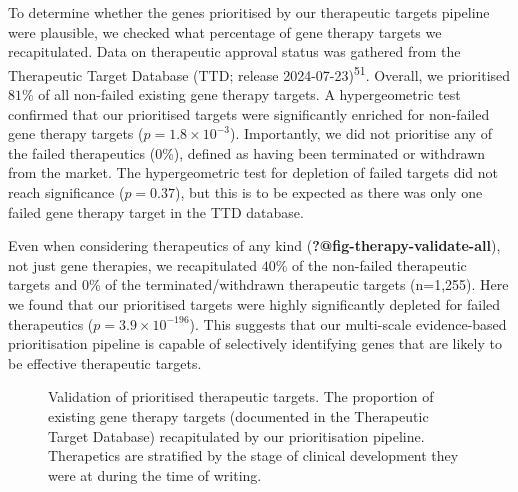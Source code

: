 \documentclass[
]{report}
\begin{document}
To determine whether the genes prioritised by our therapeutic targets
pipeline were plausible, we checked what percentage of gene therapy
targets we recapitulated. Data on therapeutic approval status was
gathered from the Therapeutic Target Database (TTD; release
2024-07-23)\textsuperscript{51}. Overall, we prioritised \(81\)\% of all
non-failed existing gene therapy targets. A hypergeometric test
confirmed that our prioritised targets were significantly enriched for
non-failed gene therapy targets (\(p=\)\(1.8 \times 10^{-3}\)).
Importantly, we did not prioritise any of the failed therapeutics (0\%),
defined as having been terminated or withdrawn from the market. The
hypergeometric test for depletion of failed targets did not reach
significance (\(p=\)\(0.37\)), but this is to be expected as there was
only one failed gene therapy target in the TTD database.

Even when considering therapeutics of any kind
(\textbf{?@fig-therapy-validate-all}), not just gene therapies, we
recapitulated \(40\)\% of the non-failed therapeutic targets and 0\% of
the terminated/withdrawn therapeutic targets (n=1,255). Here we found
that our prioritised targets were highly significantly depleted for
failed therapeutics (\(p=\)\(3.9 \times 10^{-196}\)). This suggests that
our multi-scale evidence-based prioritisation pipeline is capable of
selectively identifying genes that are likely to be effective
therapeutic targets.

\begin{figure}[H]


\caption{\label{fig-therapy-validateD08295A6-16DC-499D-85A8-8BA656E013A2}Validation
of prioritised therapeutic targets. The proportion of existing gene
therapy targets (documented in the Therapeutic Target Database)
recapitulated by our prioritisation pipeline. Therapetics are stratified
by the stage of clinical development they were at during the time of
writing.}

\end{figure}%
\end{document}
